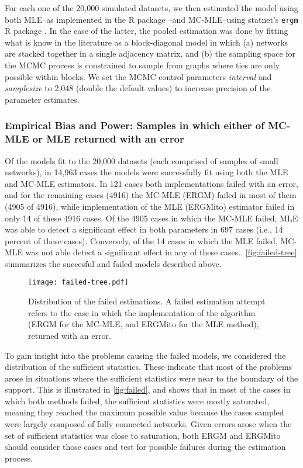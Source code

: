 \documentclass[12pt]{article}
\begin{document}
For each one of the 20,000 simulated datasets, we then estimated the model using both MLE--as implemented in the \ergmito{} R package \cite{vegayon2018}--and MC-MLE--using statnet's \texttt{ergm} R package \cite{Handcock2018,hunter2008}. In the case of the latter, the pooled estimation was done by fitting what is know in the literature as a block-diagonal model in which (a) networks are stacked together in a single adjacency matrix, and (b) the sampling space for the MCMC process is constrained to sample from graphs where ties are only possible within blocks. We set the MCMC control parameters \textit{interval} and \textit{samplesize} to 2,048 (double the default values) to increase precision of the parameter estimates.

\subsubsection{Empirical Bias and Power: Samples in which either of MC-MLE or MLE returned with an error}

Of the models fit to the 20,000 datasets (each comprised of samples of small networks), in 14,963 cases the models were successfully fit using both the MLE and MC-MLE estimators. In 121 cases both implementations failed with an error, and for the remaining cases (4916) the MC-MLE (ERGM) failed in most of them (4905 of 4916), while implementation of the MLE (ERGMito) estimator failed in only 14 of these 4916 cases. Of the 4905 cases in which the MC-MLE failed, MLE was able to detect a significant effect in both parameters in 697 cases (i.e., 14 percent of these cases). Conversely, of the 14 cases in which the MLE failed, MC-MLE was not able detect a significant effect in any of these cases.. \autoref{fig:failed-tree} summarizes the succesful and failed models described above.

\begin{figure}
	\centering
	\caption{\label{fig:failed-tree}Distribution of the failed estimations. A failed estimation attempt refers to the case in which the implementation of the algorithm (ERGM for the MC-MLE, and ERGMito for the MLE method), returned with an error.}
	\texttt{[image: failed-tree.pdf]}
\end{figure}

To gain insight into the problems causing the failed models, we considered the distribution of the sufficient statistics. These indicate that most of the problems arose in situations where the sufficient statistics were near to the boundary of the support. This is illustrated in \autoref{fig:failed}, and shows that in most of the cases in which both methods failed, the sufficient statistics were mostly saturated, meaning they reached the maximum possible value because the  cases sampled were largely composed of fully connected networks. Given errors arose when the set of sufficient statistics was close to saturation, both ERGM and ERGMito should consider those cases and test for possible failures during the estimation process.
\end{document}
